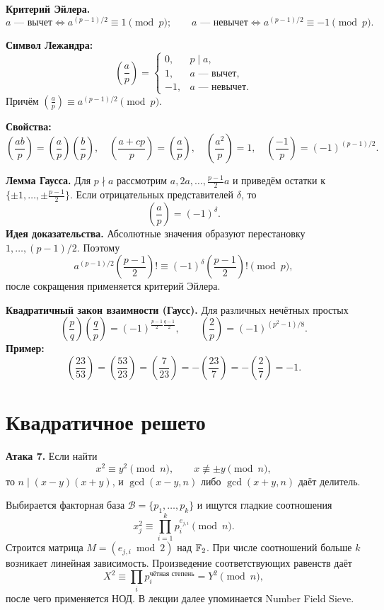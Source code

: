 \documentclass[12pt,a4paper]{article}
\begin{document}
\textbf{Критерий Эйлера.}
\[a\text{ --- вычет}\iff a^{(p-1)/2}\equiv1\pmod p;\qquad a\text{ --- невычет}\iff a^{(p-1)/2}\equiv-1\pmod p.\]

\textbf{Символ Лежандра:}
\[\left(\frac ap\right)=\begin{cases}0,&p\mid a,\\1,&a\text{ --- вычет},\\-1,&a\text{ --- невычет}.\end{cases}\]
Причём $\left(\frac ap\right)\equiv a^{(p-1)/2}\pmod p$.

\textbf{Свойства:}
\[\left(\frac{ab}{p}\right)=\left(\frac ap\right)\left(\frac bp\right),\quad
\left(\frac{a+cp}{p}\right)=\left(\frac ap\right),\quad
\left(\frac{a^2}{p}\right)=1,\quad
\left(\frac{-1}{p}\right)=(-1)^{(p-1)/2}.\]

\textbf{Лемма Гаусса.} Для $p\nmid a$ рассмотрим $a,2a,\ldots,\frac{p-1}{2}a$ и приведём остатки к $\{\pm1,\ldots,\pm\frac{p-1}{2}\}$. Если отрицательных представителей $\delta$, то
\[\left(\frac ap\right)=(-1)^\delta.\]
\textbf{Идея доказательства.} Абсолютные значения образуют перестановку $1,\ldots,(p-1)/2$. Поэтому
\[a^{(p-1)/2}\left(\frac{p-1}{2}\right)!\equiv(-1)^\delta\left(\frac{p-1}{2}\right)!\pmod p,\]
после сокращения применяется критерий Эйлера.

\textbf{Квадратичный закон взаимности (Гаусс).} Для различных нечётных простых
\[\left(\frac pq\right)\left(\frac qp\right)=(-1)^{\frac{p-1}{2}\frac{q-1}{2}},\qquad
\left(\frac2p\right)=(-1)^{(p^2-1)/8}.\]
\textbf{Пример:}
\[\left(\frac{23}{53}\right)=\left(\frac{53}{23}\right)=\left(\frac7{23}\right)=-\left(\frac{23}{7}\right)=-\left(\frac27\right)=-1.\]

\section{Квадратичное решето}
\textbf{Атака 7.} Если найти
\[x^2\equiv y^2\pmod n,\qquad x\not\equiv\pm y\pmod n,\]
то $n\mid(x-y)(x+y)$, и $\gcd(x-y,n)$ либо $\gcd(x+y,n)$ даёт делитель.

Выбирается факторная база $\mathcal B=\{p_1,\ldots,p_k\}$ и ищутся гладкие соотношения
\[x_j^2\equiv\prod_{i=1}^k p_i^{e_{j,i}}\pmod n.\]
Строится матрица $M=(e_{j,i}\bmod2)$ над $\mathbb F_2$. При числе соотношений больше $k$ возникает линейная зависимость. Произведение соответствующих равенств даёт
\[X^2\equiv\prod_i p_i^{\text{чётная степень}}=Y^2\pmod n,\]
после чего применяется НОД. В лекции далее упоминается Number Field Sieve.
\end{document}
